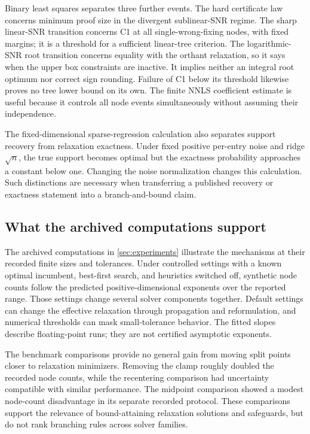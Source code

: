Binary least squares separates three further events. The hard certificate
law concerns minimum proof size in the divergent sublinear-SNR regime. The sharp
linear-SNR transition concerns C1 at all single-wrong-fixing nodes, with
fixed margins; it is a threshold for a sufficient linear-tree criterion.
The logarithmic-SNR root transition concerns equality with the orthant
relaxation, so it says when the upper box constraints are inactive. It
implies neither an integral root optimum nor correct sign rounding.
Failure of C1 below its threshold likewise proves no tree lower bound on
its own. The finite NNLS coefficient estimate is useful because it controls
all node events simultaneously without assuming their independence.

The fixed-dimensional sparse-regression calculation also separates support
recovery from relaxation exactness. Under fixed positive per-entry noise and
ridge $\sqrt n$, the true support becomes optimal but the exactness
probability approaches a constant below one. Changing the noise
normalization changes this calculation. Such distinctions are necessary
when transferring a published recovery or exactness statement into a
branch-and-bound claim.

\subsection{What the archived computations support}\label{discussion:computations}

The archived computations in \cref{sec:experiments} illustrate the mechanisms
at their recorded finite sizes and tolerances. Under controlled settings
with a known optimal incumbent, best-first search, and heuristics switched
off, synthetic node counts follow the predicted positive-dimensional
exponents over the reported range. Those settings change several solver
components together. Default settings can change the effective relaxation
through propagation and reformulation, and numerical thresholds can mask
small-tolerance behavior. The fitted slopes describe floating-point runs;
they are not certified asymptotic exponents.

The benchmark comparisons provide no general gain from moving split points
closer to relaxation minimizers. Removing the clamp roughly doubled the
recorded node counts, while the recentering comparison had uncertainty
compatible with similar performance. The midpoint comparison showed a
modest node-count disadvantage in its separate recorded protocol. These
comparisons support the relevance of bound-attaining relaxation solutions
and safeguards, but do not rank branching rules across solver families.


